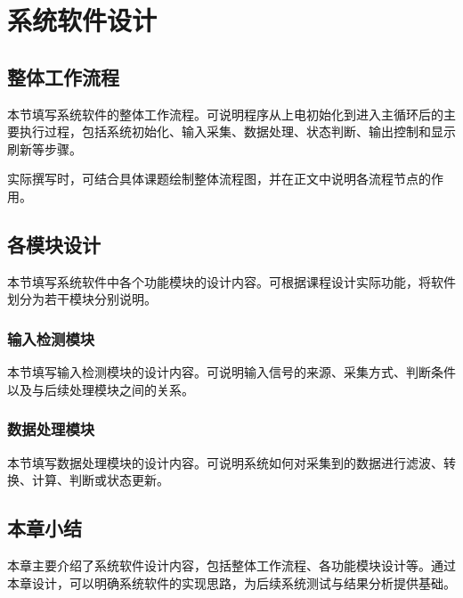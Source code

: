 \chapter{系统软件设计}

\section{整体工作流程}

本节填写系统软件的整体工作流程。可说明程序从上电初始化到进入主循环后的主要执行过程，包括系统初始化、输入采集、数据处理、状态判断、输出控制和显示刷新等步骤。

实际撰写时，可结合具体课题绘制整体流程图，并在正文中说明各流程节点的作用。

\section{各模块设计}

本节填写系统软件中各个功能模块的设计内容。可根据课程设计实际功能，将软件划分为若干模块分别说明。

\subsection{输入检测模块}

本节填写输入检测模块的设计内容。可说明输入信号的来源、采集方式、判断条件以及与后续处理模块之间的关系。

\subsection{数据处理模块}

本节填写数据处理模块的设计内容。可说明系统如何对采集到的数据进行滤波、转换、计算、判断或状态更新。


\section{本章小结}

本章主要介绍了系统软件设计内容，包括整体工作流程、各功能模块设计等。通过本章设计，可以明确系统软件的实现思路，为后续系统测试与结果分析提供基础。